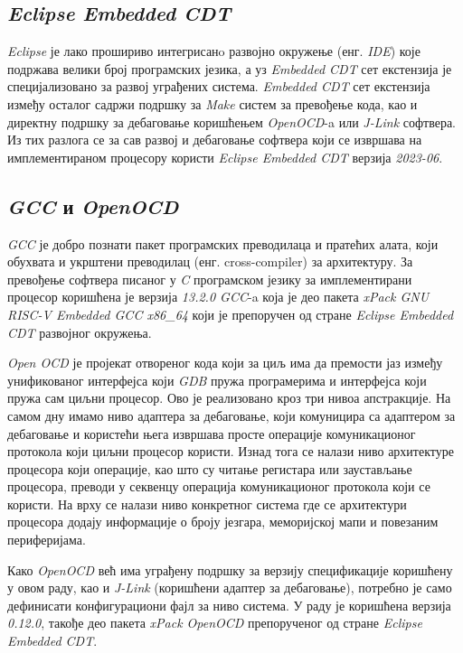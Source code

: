 \subsection{\textit{Eclipse Embedded CDT}}

\textit{Eclipse} је лако прошириво интегрисанo развојно окружење (енг. \textit{\acrfull{IDE}}) које подржава велики број програмских језика, а уз \textit{Embedded \acrfull{CDT}}\cite{embcdt} сет екстензија је специјализовано за развој уграђених система. \textit{Embedded \acrshort{CDT}} сет екстензија између осталог садржи подршку за \textit{Make} систем за превођење кода, као и директну подршку за дебаговање коришћењем \textit{OpenOCD}-a или \textit{J-Link} софтвера.
Из тих разлога се за сав развој и дебаговање софтвера који се извршава на имплементираном процесору користи \textit{Eclipse Embedded CDT} верзија \textit{2023-06}.

\subsection{\textit{GCC} и \textit{OpenOCD}}

\textit{\acrfull{GCC}}\cite{gcc} је добро познати пакет програмских преводилаца и пратећих алата, који обухвата и укрштени преводилац (енг. cross-compiler) за  архитектуру.
За превођење софтвера писаног у \textit{C} програмском језику за имплементирани процесор коришћена је верзија \textit{13.2.0 \acrshort{GCC}}-a која је део пакета \textit{xPack GNU RISC-V Embedded GCC x86\_64} који је препоручен од стране \textit{Eclipse Embedded CDT} развојног окружења.

\textit{Open \acrfull{OCD}}\cite{openocd} је пројекат отвореног кода који за циљ има да премости јаз између унификованог интерфејса који \textit{\acrfull{GDB}} пружа програмерима и интерфејса који пружа сам циљни процесор.
Ово је реализовано кроз три нивоа апстракције. На самом дну имамо ниво адаптера за дебаговање, који комуницира са адаптером за дебаговање и користећи њега извршава просте операције комуникационог протокола који циљни процесор користи. Изнад тога се налази ниво архитектуре процесора који операције, као што су читање регистара или заустављање процесора, преводи у секвенцу операција комуникационог протокола који се користи. На врху се налази ниво конкретног система где се архитектури процесора додају информације о броју језгара, меморијској мапи и повезаним периферијама.

Како \textit{Open\acrshort{OCD}} већ има уграђену подршку за верзију спецификације\cite{debug_spec} коришћену у овом раду, као и \textit{J-Link} (коришћени адаптер за дебаговање), потребно је само дефинисати конфигурациони фајл за ниво система. У раду је коришћена верзија \textit{0.12.0}, такође део пакета \textit{xPack OpenOCD} препорученог од стране \textit{Eclipse Embedded CDT}.

